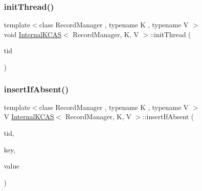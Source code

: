 \mbox{\label{classInternalKCAS_ab4fe3ffb3c0839a75a9a4272750d10e4}} 
\subsubsection{\texorpdfstring{init\+Thread()}{initThread()}\hspace{0.1cm}{\footnotesize\ttfamily [2/2]}}
{\footnotesize\ttfamily template$<$class Record\+Manager , typename K , typename V $>$ \\
void \hyperlink{classInternalKCAS}{Internal\+K\+C\+AS}$<$ Record\+Manager, K, V $>$\+::init\+Thread (\begin{DoxyParamCaption}\item[{const int}]{tid }\end{DoxyParamCaption})}

\mbox{\label{classInternalKCAS_ab3010217722850563fca996779d44aaf}} 
\subsubsection{\texorpdfstring{insert\+If\+Absent()}{insertIfAbsent()}\hspace{0.1cm}{\footnotesize\ttfamily [1/2]}}
{\footnotesize\ttfamily template$<$class Record\+Manager , typename K , typename V $>$ \\
V \hyperlink{classInternalKCAS}{Internal\+K\+C\+AS}$<$ Record\+Manager, K, V $>$\+::insert\+If\+Absent (\begin{DoxyParamCaption}\item[{const int}]{tid,  }\item[{const K \&}]{key,  }\item[{const V \&}]{value }\end{DoxyParamCaption})}

\mbox{\label{classInternalKCAS_ab3010217722850563fca996779d44aaf}} 
